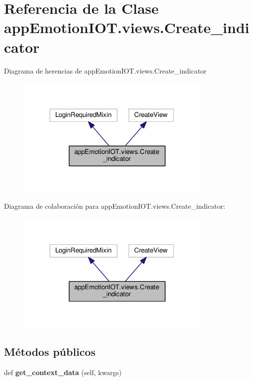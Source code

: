 \hypertarget{classappEmotionIOT_1_1views_1_1Create__indicator}{}\section{Referencia de la Clase app\+Emotion\+I\+O\+T.\+views.\+Create\+\_\+indicator}
\label{classappEmotionIOT_1_1views_1_1Create__indicator}


Diagrama de herencias de app\+Emotion\+I\+O\+T.\+views.\+Create\+\_\+indicator
\nopagebreak
\begin{figure}[H]
\begin{center}
\leavevmode
\includegraphics[width=268pt]{classappEmotionIOT_1_1views_1_1Create__indicator__inherit__graph}
\end{center}
\end{figure}


Diagrama de colaboración para app\+Emotion\+I\+O\+T.\+views.\+Create\+\_\+indicator\+:
\nopagebreak
\begin{figure}[H]
\begin{center}
\leavevmode
\includegraphics[width=268pt]{classappEmotionIOT_1_1views_1_1Create__indicator__coll__graph}
\end{center}
\end{figure}
\subsection*{Métodos públicos}
\begin{DoxyCompactItemize}
\item 
def {\bfseries get\+\_\+context\+\_\+data} (self, kwargs)\hypertarget{classappEmotionIOT_1_1views_1_1Create__indicator_aa3c208e28f3b2183d7aeb03115b6f6e3}{}\label{classappEmotionIOT_1_1views_1_1Create__indicator_aa3c208e28f3b2183d7aeb03115b6f6e3}

\end{DoxyCompactItemize}
